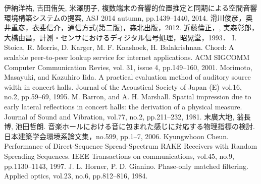 \begin{thebibliography}{99}
伊納洋祐, 吉田侑矢, 米澤朋子,	複数端末の音響的位置推定と同期による空間音響環境構築システムの提案,	ASJ 2014 autumn,	pp.1439--1440,	2014.
滑川俊彦，奥井重彦，衣斐信介，通信方式(第二版)，森北出版，2012.
近藤倫正，, 実森彰郎，大橋由昌，計測・センサにおけるディジタル信号処理，昭晃堂，1993．
I. Stoica, R. Morris, D. Karger, M. F. Kaashoek, H. Balakrishnan.
Chord: A scalable peer-to-peer lookup service for internet applications.
ACM SIGCOMM Computer Communication Revies, vol. 31, issue 4, pp.149--160,
2001.
Morimoto, Masayuki, and Kazuhiro Iida. A practical evaluation method of auditory source width in concert halls. Journal of the Acoustical Society of Japan (E) vol.16, no.2, pp.59--69, 1995.
M. Barron, and A. H. Marshall. Spatial impression due to early lateral reflections in concert halls: the derivation of a physical measure. Journal of Sound and Vibration, vol.77, no.2, pp.211--232, 1981.
末廣大地, 翁長博, 池田哲朗. 音楽ホールにおける音に包まれた感じに対応する物理指標の検討. 日本建築学会環境系論文集，no.599, pp.1--7, 2006.
Kyungwhoon Cheun. Performance of Direct-Sequence Spread-Spectrum RAKE Receivers with Random Spreading Sequences.
IEEE Transactions on communications, vol.45, no.9, pp.1130--1143, 1997.
J. L. Horner, P. D. Gianino. Phase-only matched filtering. Applied optics, vol.23, no.6, pp.812--816, 1984.


\end{thebibliography}
